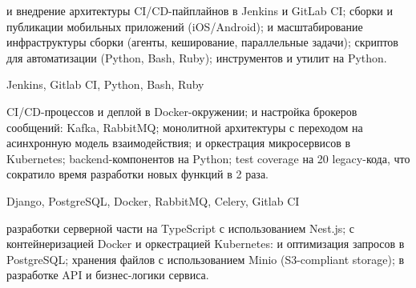 \documentclass[10pt,a4paper,ragged2e,withhyper]{altacv}
\begin{document}
\begin{paracol}{2}


\begin{itemize}
   и внедрение архитектуры CI/CD-пайплайнов в Jenkins и GitLab CI;
   сборки и публикации мобильных приложений (iOS/Android);
   и масштабирование инфраструктуры сборки (агенты, кеширование, параллельные задачи);
   скриптов для автоматизации (Python, Bash, Ruby);
   инструментов и утилит на Python.
\end{itemize}
Jenkins, Gitlab CI, Python, Bash, Ruby

\divider


\begin{itemize}
   CI/CD-процессов и деплой в Docker-окружении;
   и настройка брокеров сообщений: Kafka, RabbitMQ;
   монолитной архитектуры с переходом на асинхронную модель взаимодействия;
   и оркестрация микросервисов в Kubernetes;
   backend-компонентов на Python;
   test coverage на 20%
   legacy-кода, что сократило время разработки новых функций в 2 раза.
\end{itemize}
Django, PostgreSQL, Docker, RabbitMQ, Celery, Gitlab CI

\divider


\begin{itemize}
   разработки серверной части на TypeScript с использованием Nest.js;
   с контейнеризацией Docker и оркестрацией Kubernetes:
   и оптимизация запросов в PostgreSQL;
   хранения файлов с использованием Minio (S3-compliant storage);
   в разработке API и бизнес-логики сервиса.
\end{itemize}

\switchcolumn


\end{paracol}
\end{document}
